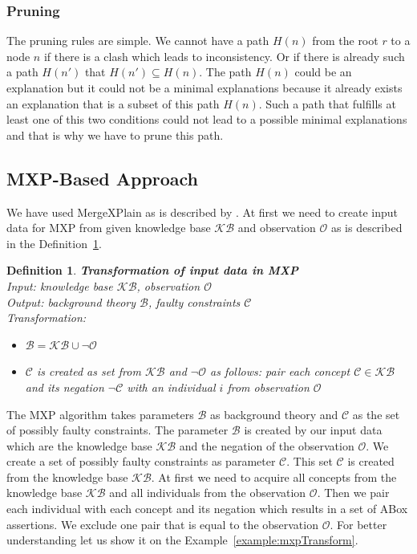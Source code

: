 \documentclass[12pt,a4paper]{article}
\newtheorem{definition}{Definition}[subsection]
\begin{document}
\subsubsection{Pruning}
\label{subsubsection:pruning}
The pruning rules are simple. We cannot have a path $H(n)$ from the root $r$ to a node $n$ if there is a clash which leads to inconsistency. Or if there is already such a path $H(n')$ that $H(n') \subseteq H(n)$. The path $H(n)$ could be an explanation but it could not be a minimal explanations because it already exists an explanation that is a subset of this path $H(n)$. Such a path that fulfills at least one of this two conditions could not lead to a possible minimal explanations and that is why we have to prune this path.

\subsection{MXP-Based Approach}
\label{subsection:MXPBasedApproach}
We have used MergeXPlain as is described by \cite{MXP}. At first we need to create input data for MXP from given knowledge base $\mathcal{KB}$ and observation $\mathcal{O}$ as is described in the Definition~\ref{def:mxpTransform}. 

\begin{definition}{\textbf{Transformation of input data in MXP}} \\
	\label{def:mxpTransform}
	\noindent Input: knowledge base $\mathcal{KB}$, observation $\mathcal{O}$ \\
	Output: background theory $\mathcal{B}$, faulty constraints $\mathcal{C}$ \\
	Transformation: 
	\begin{itemize}
		\item $\mathcal{B} = \mathcal{KB} \cup \neg \mathcal{O}$ 
		\item $\mathcal{C}$ is created as set from $\mathcal{KB}$ and $\neg \mathcal{O}$ as follows: pair each concept $\mathcal{C} \in \mathcal{KB}$ and its negation $\neg \mathcal{C}$ with an individual $i$ from observation $\mathcal{O}$
	\end{itemize}
\end{definition}

The MXP algorithm takes parameters $\mathcal{B}$ as background theory and $\mathcal{C}$ as the set of possibly faulty constraints. The parameter $\mathcal{B}$ is created by our input data which are the knowledge base $\mathcal{KB}$ and the negation of the observation $\mathcal{O}$. We create a set of possibly faulty constraints as parameter $\mathcal{C}$. This set $\mathcal{C}$ is created from the knowledge base $\mathcal{KB}$. At first we need to acquire all concepts from the knowledge base $\mathcal{KB}$ and all individuals from the observation $\mathcal{O}$. Then we pair each individual with each concept and its negation which results in a set of ABox assertions. We exclude one pair that is equal to the observation $\mathcal{O}$. For better understanding let us show it on the Example~\ref{example:mxpTransform}.
\end{document}
